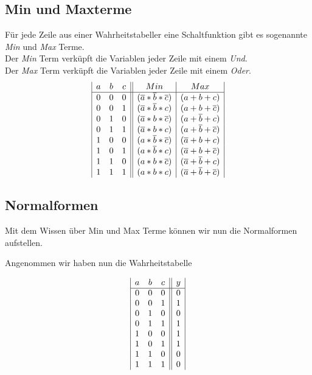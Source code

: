 \documentclass{article}
\begin{document}
\subsection{Min und Maxterme}

Für jede Zeile aus einer Wahrheitstabeller eine Schaltfunktion gibt es sogenannte \emph{Min} und \emph{Max} Terme. \\
Der \emph{Min} Term verküpft die Variablen jeder Zeile mit einem \emph{Und}. \\
Der \emph{Max} Term verküpft die Variablen jeder Zeile mit einem \emph{Oder}. \\


\begin{align*}
\begin{array}{|c c c || c | c |}
    a & b & c & Min & Max \\
    \hline 
    0 & 0 & 0 & (\overline{a}*\overline{b}*\overline{c}) & (a+b+c)  \\
    0 & 0 & 1 & (\overline{a}*\overline{b}*c) & (a+b+\overline{c})   \\
    0 & 1 & 0 & (\overline{a}*b*\overline{c}) & (a+\overline{b}+c)  \\
    0 & 1 & 1 & (\overline{a}*b*c) & (a+\overline{b}+\overline{c}) \\
    1 & 0 & 0 & (a*\overline{b}*\overline{c}) & (\overline{a}+b+c)  \\ 
    1 & 0& 1 & (a*\overline{b}*c) & (\overline{a}+b+\overline{c})   \\ 
    1 & 1 & 0 & (a*b*\overline{c}) & (\overline{a}+\overline{b}+c)  \\
    1 & 1 & 1 &  (a*b*c) & (\overline{a}+\overline{b}+\overline{c})  \\
\end{array}
\end{align*}

\subsection{Normalformen}

Mit dem Wissen über Min und Max Terme können wir nun die Normalformen aufstellen. 

Angenommen wir haben nun die Wahrheitstabelle  

\begin{align*}
    \begin{array}{|c c c || c | c |}
        a & b & c & y  \\
        \hline 
        0 & 0 & 0 & 0  \\
        0 & 0 & 1 & 1   \\
        0 & 1 & 0 & 0  \\
        0 & 1 & 1 & 1 \\
        1 & 0 & 0 & 1  \\ 
        1 & 0& 1 & 1  \\ 
        1 & 1 & 0 & 0 \\
        1 & 1 & 1 &  0 \\
    \end{array}
    \end{align*}
    
\end{document}

